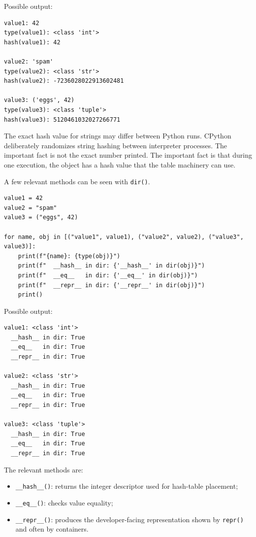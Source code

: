 Possible output:

\begin{verbatim}
value1: 42
type(value1): <class 'int'>
hash(value1): 42

value2: 'spam'
type(value2): <class 'str'>
hash(value2): -7236028022913602481

value3: ('eggs', 42)
type(value3): <class 'tuple'>
hash(value3): 5120461032027266771
\end{verbatim}

The exact hash value for strings may differ between Python runs. CPython deliberately randomizes string hashing between interpreter processes. The important fact is not the exact number printed. The important fact is that during one execution, the object has a hash value that the table machinery can use.

A few relevant methods can be seen with \texttt{dir()}.

\begin{verbatim}
value1 = 42
value2 = "spam"
value3 = ("eggs", 42)

for name, obj in [("value1", value1), ("value2", value2), ("value3", value3)]:
    print(f"{name}: {type(obj)}")
    print(f"  __hash__ in dir: {'__hash__' in dir(obj)}")
    print(f"  __eq__   in dir: {'__eq__' in dir(obj)}")
    print(f"  __repr__ in dir: {'__repr__' in dir(obj)}")
    print()
\end{verbatim}

Possible output:

\begin{verbatim}
value1: <class 'int'>
  __hash__ in dir: True
  __eq__   in dir: True
  __repr__ in dir: True

value2: <class 'str'>
  __hash__ in dir: True
  __eq__   in dir: True
  __repr__ in dir: True

value3: <class 'tuple'>
  __hash__ in dir: True
  __eq__   in dir: True
  __repr__ in dir: True
\end{verbatim}

The relevant methods are:

\begin{itemize}
    \item \texttt{\_\_hash\_\_()}: returns the integer descriptor used for hash-table placement;
    \item \texttt{\_\_eq\_\_()}: checks value equality;
    \item \texttt{\_\_repr\_\_()}: produces the developer-facing representation shown by \texttt{repr()} and often by containers.
\end{itemize}

